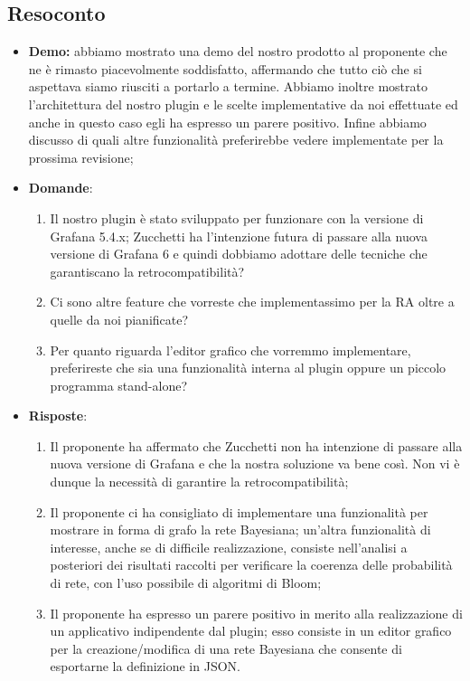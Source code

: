 \subsection{Resoconto}
\begin{itemize}
	\item \textbf{Demo:} abbiamo mostrato una demo del nostro prodotto al proponente che ne è rimasto piacevolmente soddisfatto, affermando che tutto ciò che si aspettava siamo riusciti a portarlo a termine. Abbiamo inoltre mostrato l'architettura del nostro plugin e le scelte implementative da noi effettuate ed anche in questo caso egli ha espresso un parere positivo. Infine abbiamo discusso di quali altre funzionalità preferirebbe vedere implementate per la prossima revisione;
	\item {\textbf{Domande}:
		\begin{enumerate}
			\item Il nostro plugin è stato sviluppato per funzionare con la versione di Grafana 5.4.x; Zucchetti ha l'intenzione futura di passare alla nuova versione di Grafana 6 e quindi dobbiamo adottare delle tecniche che garantiscano la retrocompatibilità?
			\item Ci sono altre feature che vorreste che implementassimo per la RA oltre a quelle da noi pianificate?
			\item Per quanto riguarda l'editor grafico che vorremmo implementare, preferireste che sia una funzionalità interna al plugin oppure un piccolo programma stand-alone?
		\end{enumerate}}
	\item {\textbf{Risposte}:
		\begin{enumerate}
			\item Il proponente ha affermato che Zucchetti non ha intenzione di passare alla nuova versione di Grafana e che la nostra soluzione va bene così. Non vi è dunque la necessità di garantire la retrocompatibilità;
			\item Il proponente ci ha consigliato di implementare una funzionalità per mostrare in forma di grafo la rete Bayesiana; un'altra funzionalità di interesse, anche se di difficile realizzazione, consiste nell'analisi a posteriori dei risultati raccolti per verificare la coerenza delle probabilità di rete, con l'uso possibile di algoritmi di Bloom;
			\item Il proponente ha espresso un parere positivo in merito alla realizzazione di un applicativo indipendente dal plugin; esso consiste in un editor grafico per la creazione/modifica di una rete Bayesiana che consente di esportarne la definizione in JSON.
		\end{enumerate}}
\end{itemize}

